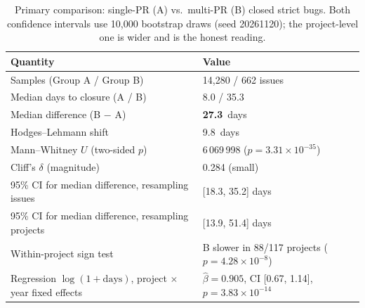 \begin{table}[t]
\centering
\caption{Primary comparison: single-PR (A) vs.\ multi-PR (B) closed strict bugs. Both confidence intervals use 10{,}000 bootstrap draws (seed 20261120); the project-level one is wider and is the honest reading.\label{tab:main}}
\small \begin{tabular}{@{}ll@{}}
\toprule
Quantity & Value \\\midrule
Samples (Group A / Group B) & 14,280 / 662 issues \\
Median days to closure (A / B) & 8.0 / 35.3 \\
Median difference (B $-$ A) & \textbf{27.3}~days \\
Hodges--Lehmann shift & 9.8~days \\
Mann--Whitney $U$ (two-sided $p$) & 6\,069\,998 ($p=3.31\times 10^{-35}$) \\
Cliff's $\delta$ (magnitude) & 0.284 (small) \\
95\% CI for median difference, resampling issues & [18.3, 35.2] days \\
95\% CI for median difference, resampling projects & [13.9, 51.4] days \\
Within-project sign test & B slower in 88/117 projects ($p=4.28\times 10^{-8}$) \\
Regression $\log(1+\text{days})$, project $\times$ year fixed effects & $\hat\beta=0.905$, CI [0.67, 1.14], $p=3.83\times 10^{-14}$ \\
\bottomrule
\end{tabular}
\end{table}
